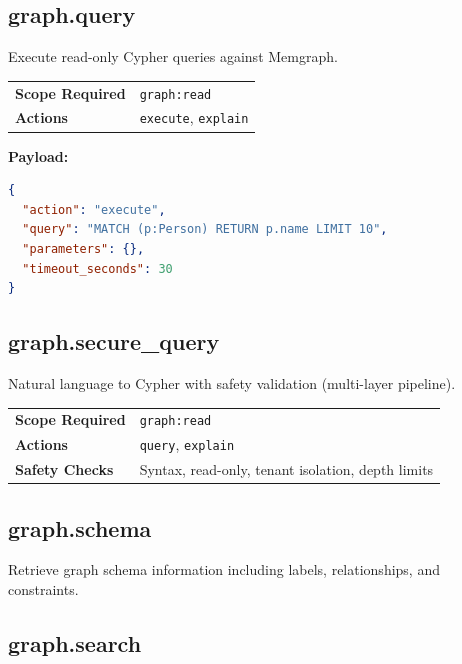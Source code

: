 \documentclass[a4paper,twoside]{sapthesis}
\begin{document}
\subsection{graph.query}

Execute read-only Cypher queries against Memgraph.

\begin{table}[ht]
\centering
\small
\begin{tabularx}{\textwidth}{lX}
    \hline
    \textbf{Scope Required} & \texttt{graph:read} \\
    \textbf{Actions} & \texttt{execute}, \texttt{explain} \\
    \hline
\end{tabularx}
\end{table}

\textbf{Payload:}
\begin{lstlisting}[language=json]
{
  "action": "execute",
  "query": "MATCH (p:Person) RETURN p.name LIMIT 10",
  "parameters": {},
  "timeout_seconds": 30
}
\end{lstlisting}

\subsection{graph.secure\_query}

Natural language to Cypher with safety validation (multi-layer pipeline).

\begin{table}[ht]
\centering
\small
\begin{tabularx}{\textwidth}{lX}
    \hline
    \textbf{Scope Required} & \texttt{graph:read} \\
    \textbf{Actions} & \texttt{query}, \texttt{explain} \\
    \textbf{Safety Checks} & Syntax, read-only, tenant isolation, depth limits \\
    \hline
\end{tabularx}
\end{table}

\subsection{graph.schema}

Retrieve graph schema information including labels, relationships, and constraints.

\subsection{graph.search}
\end{document}

